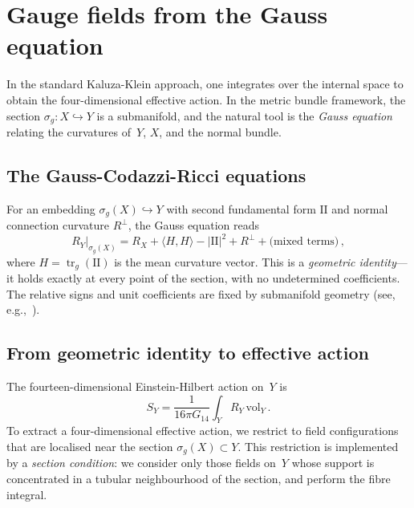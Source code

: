 \documentclass[12pt,a4paper]{article}
\theoremstyle{definition}
\newcommand{\tr}{\operatorname{tr}}
\begin{document}
\section{Gauge fields from the Gauss equation}
\label{sec:gauss}

In the standard Kaluza-Klein approach, one integrates over the internal space to obtain the four-dimensional effective action.
In the metric bundle framework, the section $\sigma_g\colon X \hookrightarrow Y$ is a submanifold, and the natural tool is the \emph{Gauss equation} relating the curvatures of~$Y$, $X$, and the normal bundle.

\subsection{The Gauss-Codazzi-Ricci equations}

For an embedding $\sigma_g(X) \hookrightarrow Y$ with second fundamental form $\mathrm{I\!I}$ and normal connection curvature $R^\perp$, the Gauss equation reads
\begin{equation}
\label{eq:gauss}
R_Y\big|_{\sigma_g(X)} = R_X + \langle H, H \rangle - |\mathrm{I\!I}|^2 + R^\perp + \text{(mixed terms)}\,,
\end{equation}
where $H = \tr_g(\mathrm{I\!I})$ is the mean curvature vector.
This is a \emph{geometric identity}---it holds exactly at every point of the section, with no undetermined coefficients.
The relative signs and unit coefficients are fixed by submanifold geometry (see, e.g.,~\cite{KobayashiNomizu}).

\subsection{From geometric identity to effective action}

The fourteen-dimensional Einstein-Hilbert action on~$Y$ is
\begin{equation}
\label{eq:14d_action}
S_Y = \frac{1}{16\pi G_{14}} \int_Y R_Y\, \mathrm{vol}_Y\,.
\end{equation}
To extract a four-dimensional effective action, we restrict to field configurations that are localised near the section $\sigma_g(X) \subset Y$.
This restriction is implemented by a \emph{section condition}: we consider only those fields on~$Y$ whose support is concentrated in a tubular neighbourhood of the section, and perform the fibre integral.
\end{document}
